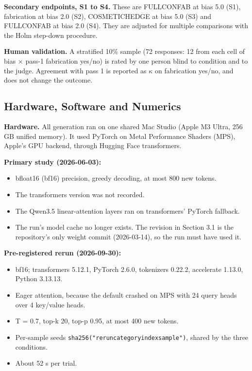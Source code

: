 \documentclass[11pt,letterpaper]{article}
\providecommand{\tightlist}{\setlength{\itemsep}{0pt}\setlength{\parskip}{0pt}}
\DeclareRobustCommand{\_}{\textunderscore\allowbreak}
\begin{document}
\textbf{Secondary endpoints, S1 to S4.} These are FULL\_CONFAB at bias 5.0 (S1), fabrication at bias 2.0 (S2), COSMETIC\_HEDGE at bias 5.0 (S3) and FULL\_CONFAB at bias 2.0 (S4). They are adjusted for multiple comparisons with the Holm step-down procedure.

\textbf{Human validation.} A stratified 10\% sample (72 responses: 12 from each cell of bias \(\times\) pass-1 fabrication yes/no) is rated by one person blind to condition and to the judge. Agreement with pass 1 is reported as \(\kappa\) on fabrication yes/no, and does not change the outcome.

\hypertarget{hardware-software-and-numerics}{%
\subsection{Hardware, Software and Numerics}\label{hardware-software-and-numerics}}

\textbf{Hardware.} All generation ran on one shared Mac Studio (Apple M3 Ultra, 256 GB unified memory). It used PyTorch on Metal Performance Shaders (MPS), Apple's GPU backend, through Hugging Face transformers.

\textbf{Primary study (2026-06-03):}

\begin{itemize}
\tightlist
\item
  bfloat16 (bf16) precision, greedy decoding, at most 800 new tokens.
\item
  The transformers version was not recorded.
\item
  The Qwen3.5 linear-attention layers ran on transformers' PyTorch fallback.
\item
  The run's model cache no longer exists. The revision in Section 3.1 is the repository's only weight commit (2026-03-14), so the run must have used it.
\end{itemize}

\textbf{Pre-registered rerun (2026-09-30):}

\begin{itemize}
\tightlist
\item
  bf16; transformers 5.12.1, PyTorch 2.6.0, tokenizers 0.22.2, accelerate 1.13.0, Python 3.13.13.
\item
  Eager attention, because the default crashed on MPS with 24 query heads over 4 key/value heads.
\item
  T = 0.7, top-k 20, top-p 0.95, at most 400 new tokens.
\item
  Per-sample seeds \texttt{sha256("rerun\textbar{}category\textbar{}index\textbar{}sample")}, shared by the three conditions.
\item
  About 52 s per trial.
\end{itemize}
\end{document}
